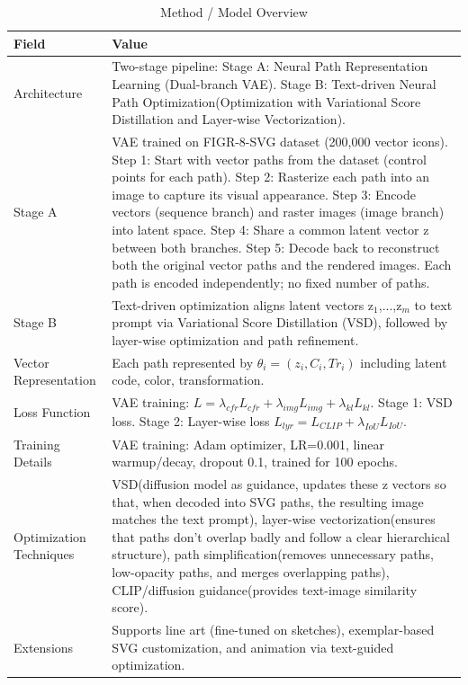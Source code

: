 \begin{table}[h!]
\centering
\caption{Method / Model Overview}
\begin{tabular}{|l|p{10cm}|}
\hline
\textbf{Field} & \textbf{Value} \\ \hline
Architecture & Two-stage pipeline: Stage A: Neural Path Representation Learning (Dual-branch VAE). Stage B: Text-driven Neural Path Optimization(Optimization with Variational Score Distillation and Layer-wise Vectorization). \\ \hline
Stage A & VAE trained on FIGR-8-SVG dataset (200,000 vector icons).  
Step 1: Start with vector paths from the dataset (control points for each path).  
Step 2: Rasterize each path into an image to capture its visual appearance.  
Step 3: Encode vectors (sequence branch) and raster images (image branch) into latent space.  
Step 4: Share a common latent vector z between both branches.  
Step 5: Decode back to reconstruct both the original vector paths and the rendered images.  
Each path is encoded independently; no fixed number of paths. \\ \hline
Stage B & Text-driven optimization aligns latent vectors z$_1$,...,z$_m$ to text prompt via Variational Score Distillation (VSD), followed by layer-wise optimization and path refinement. \\ \hline
Vector Representation & Each path represented by $\theta_i=(z_i, C_i, Tr_i)$ including latent code, color, transformation. \\ \hline
Loss Function & VAE training: $L = \lambda_{cfr} L_{cfr} + \lambda_{img} L_{img} + \lambda_{kl} L_{kl}$. Stage 1: VSD loss. Stage 2: Layer-wise loss $L_{lyr} = L_{CLIP} + \lambda_{IoU} L_{IoU}$. \\ \hline
Training Details & VAE training: Adam optimizer, LR=0.001, linear warmup/decay, dropout 0.1, trained for 100 epochs. \\ \hline
Optimization Techniques & VSD(diffusion model as guidance, updates these z vectors so that, when decoded into SVG paths, the resulting image matches the text prompt), layer-wise vectorization(ensures that paths don’t overlap badly and follow a clear hierarchical structure), path simplification(removes unnecessary paths, low-opacity paths, and merges overlapping paths), CLIP/diffusion guidance(provides text-image similarity score). \\ \hline
Extensions & Supports line art (fine-tuned on sketches), exemplar-based SVG customization, and animation via text-guided optimization. \\ \hline
\end{tabular}
\end{table}
